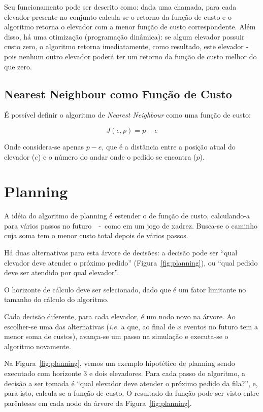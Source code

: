 Seu funcionamento pode ser descrito como: dada uma chamada, para cada elevador
presente no conjunto calcula-se o retorno da função de custo e o algoritmo
retorna o elevador com a menor função de custo correspondente. Além disso, há
uma otimização (programação dinâmica): se algum elevador possuir custo zero, o
algoritmo retorna imediatamente, como resultado, este elevador - pois nenhum
outro elevador poderá ter um retorno da função de custo melhor do que zero.

\subsection{Nearest Neighbour como Função de Custo}

É possível definir o algoritmo de \textit{Nearest Neighbour} como uma função de
custo:

\[J(e, p) = p - e\]

Onde considera-se apenas $p - e$, que é a distância entre a posição atual do
elevador ($e$) e o número do andar onde o pedido se encontra ($p$).

\section{Planning}


A idéia do algoritmo de planning é estender o de função de custo, calculando-a
para vários passos no futuro~\cite{Koehler00elevatorcontrol}~-~como em um jogo de xadrez. Busca-se o
caminho cuja soma tem o menor custo total depois de vários passos.

Há duas alternativas para esta árvore de decisões: a decisão pode ser ``qual
elevador deve atender o próximo pedido'' (Figura~\ref{fig:planning}),
ou ``qual pedido deve ser atendido por qual elevador''. %

O horizonte de cálculo deve ser selecionado, dado que é um fator limitante no
tamanho do cálculo do algoritmo.

Cada decisão diferente, para cada elevador, é um nodo novo na árvore. Ao
escolher-se uma das alternativas (\textit{i.e.} a que, ao final de $x$ eventos
no futuro tem a menor soma de custos), avança-se um passo na simulação e executa-se o
algoritmo novamente.

Na Figura~\ref{fig:planning}, vemos um exemplo hipotético de planning sendo executado com
horizonte 3 e dois elevadores. Para cada passo do algoritmo, a decisão a ser
tomada é ``qual elevador deve atender o próximo pedido da fila?'', e, para isto,
calcula-se a função de custo. O resultado da função pode ser visto entre
parênteses em cada nodo da árvore da Figura~\ref{fig:planning}.

